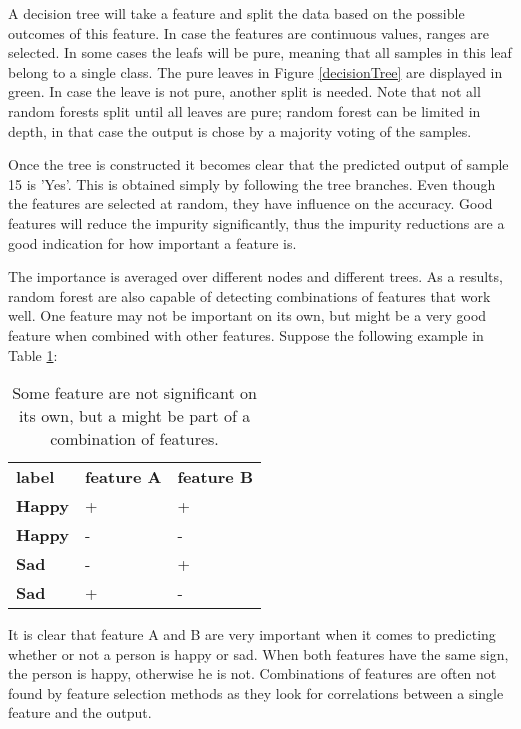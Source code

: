 A decision tree will take a feature and split the data based on the possible outcomes of this feature. In case the features are continuous values, ranges are selected. In some cases the leafs will be pure, meaning that all samples in this leaf belong to a single class. The pure leaves in Figure \ref{decisionTree} are displayed in green. In case the leave is not pure, another split is needed. Note that not all random forests split until all leaves are pure; random forest can be limited in depth, in that case the output is chose by a majority voting of the samples.


\clearpage

Once the tree is constructed it becomes clear that the predicted output of sample 15 is 'Yes'. This is obtained simply by following the tree branches. Even though the features are selected at random, they have influence on the accuracy. Good features will reduce the impurity significantly, thus the impurity reductions are a good indication for how important a feature is.

\npar

The importance is averaged over different nodes and different trees. As a results, random forest are also capable of detecting combinations of features that work well. One feature may not be important on its own, but might be a very good feature when combined with other features. Suppose the following example in Table \ref{featPair}:

\begin{table}[H]
\centering
\begin{tabular}{lll}
\textbf{label} & \textbf{feature A} & \textbf{feature B} \\
\textbf{Happy} & +                  & +                  \\
\textbf{Happy} & -                  & -                  \\
\textbf{Sad}   & -                  & +                  \\
\textbf{Sad}   & +                  & -                 
\end{tabular}
\caption{Some feature are not significant on its own, but a might be part of a combination of features.\label{featPair}}
\end{table}

It is clear that feature A and B are very important when it comes to predicting whether or not a person is happy or sad. When both features have the same sign, the person is happy, otherwise he is not. Combinations of features are often not found by feature selection methods as they look for correlations between a single feature and the output.

